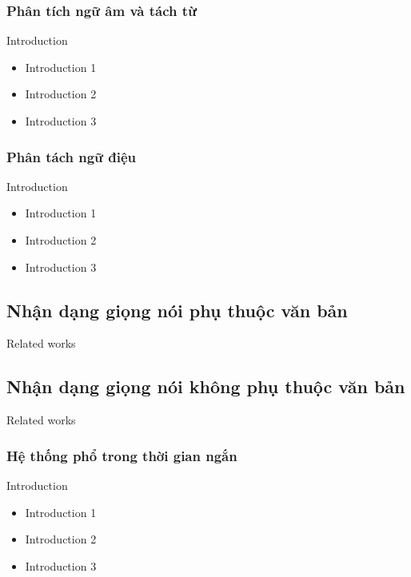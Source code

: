 \documentclass[11pt]{beamer}
\begin{document}
\subsubsection{Phân tích ngữ âm và tách từ}
\begin{frame}{Introduction}
	\begin{itemize}
		\item Introduction 1
		\item Introduction 2
		\item Introduction 3
	\end{itemize}
\end{frame}
\subsubsection{Phân tách ngữ điệu}
\begin{frame}{Introduction}
	\begin{itemize}
		\item Introduction 1
		\item Introduction 2
		\item Introduction 3
	\end{itemize}
\end{frame}

\subsection{Nhận dạng giọng nói phụ thuộc văn bản}
\begin{frame}{Related works}
\end{frame}

\subsection{Nhận dạng giọng nói không phụ thuộc văn bản}
\begin{frame}{Related works}
\end{frame}
\subsubsection{Hệ thống phổ trong thời gian ngắn}
\begin{frame}{Introduction}
	\begin{itemize}
		\item Introduction 1
		\item Introduction 2
		\item Introduction 3
	\end{itemize}
\end{frame}
\end{document}

